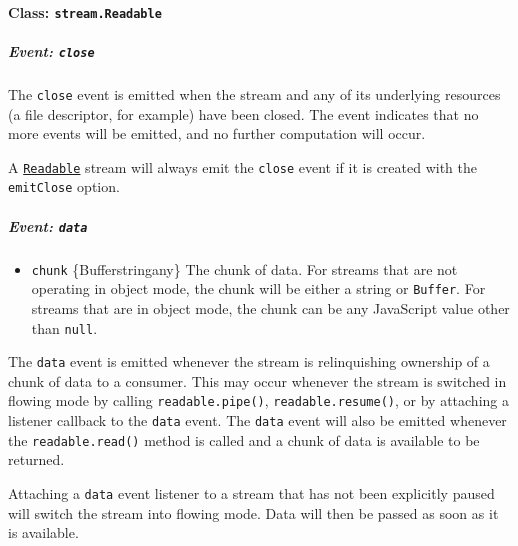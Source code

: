 \paragraph{\texorpdfstring{Class:
\texttt{stream.Readable}}{Class: stream.Readable}}\label{class-stream.readable}

\subparagraph{\texorpdfstring{Event:
\texttt{\textquotesingle{}close\textquotesingle{}}}{Event: \textquotesingle close\textquotesingle{}}}\label{event-close-1}

The \texttt{\textquotesingle{}close\textquotesingle{}} event is emitted
when the stream and any of its underlying resources (a file descriptor,
for example) have been closed. The event indicates that no more events
will be emitted, and no further computation will occur.

A \hyperref[class-streamreadable]{\texttt{Readable}} stream will always
emit the \texttt{\textquotesingle{}close\textquotesingle{}} event if it
is created with the \texttt{emitClose} option.

\subparagraph{\texorpdfstring{Event:
\texttt{\textquotesingle{}data\textquotesingle{}}}{Event: \textquotesingle data\textquotesingle{}}}\label{event-data}

\begin{itemize}
\tightlist
\item
  \texttt{chunk} \{Buffer\textbar string\textbar any\} The chunk of
  data. For streams that are not operating in object mode, the chunk
  will be either a string or \texttt{Buffer}. For streams that are in
  object mode, the chunk can be any JavaScript value other than
  \texttt{null}.
\end{itemize}

The \texttt{\textquotesingle{}data\textquotesingle{}} event is emitted
whenever the stream is relinquishing ownership of a chunk of data to a
consumer. This may occur whenever the stream is switched in flowing mode
by calling \texttt{readable.pipe()}, \texttt{readable.resume()}, or by
attaching a listener callback to the
\texttt{\textquotesingle{}data\textquotesingle{}} event. The
\texttt{\textquotesingle{}data\textquotesingle{}} event will also be
emitted whenever the \texttt{readable.read()} method is called and a
chunk of data is available to be returned.

Attaching a \texttt{\textquotesingle{}data\textquotesingle{}} event
listener to a stream that has not been explicitly paused will switch the
stream into flowing mode. Data will then be passed as soon as it is
available.

